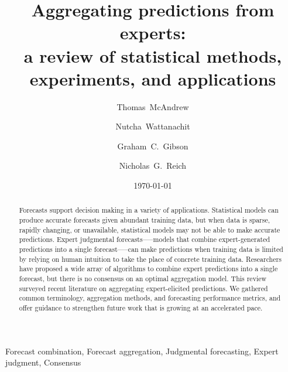 \documentclass[preprint,authoryear]{elsarticle}
\date{\today}
\begin{document}
   \begin{frontmatter}

     \title{Aggregating predictions from experts: \\ a review of statistical methods, experiments, and applications}

     \author[1]{Thomas~McAndrew }
     
     \author[1]{Nutcha~Wattanachit}

     \author[1]{Graham~C.~Gibson}
     
     \author[1]{Nicholas~G.~Reich}
     
     
     
      \address[1]{Department of Biostatistics and Epidemiology, School of Public Health and Health Sciences, University of Massachusetts at Amherst, Amherst, Massachusetts, USA}

\begin{abstract}
  Forecasts support decision making in a variety of applications.
  Statistical models can produce accurate forecasts given abundant training data, but when data is sparse, rapidly changing, or unavailable, statistical models may not be able to make accurate predictions.
  Expert judgmental forecasts--—models that combine expert-generated predictions into a single forecast—--can make predictions when training data is limited by relying on human intuition to take the place of concrete training data.
  Researchers have proposed a wide array of algorithms to combine expert predictions into a single forecast, but there is no consensus on an optimal aggregation model.
  This review surveyed recent literature on aggregating expert-elicited predictions.
  We gathered common terminology, aggregation methods, and forecasting performance metrics, and offer guidance to strengthen future work that is growing at an accelerated pace.
\end{abstract}

\begin{keyword}
Forecast combination, Forecast aggregation, Judgmental forecasting, Expert judgment, Consensus 
\end{keyword}

\end{frontmatter}
\end{document}
